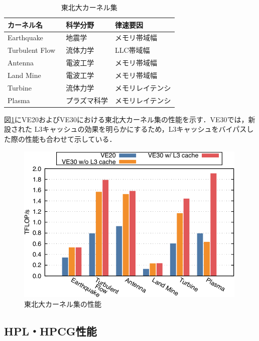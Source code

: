 ﻿\documentclass[submit,techrep,noauthor]{ipsj}
\begin{document}
\begin{table}
\caption{東北大カーネル集}\label{tbl:isc-kernels}
\begin{tabular}{@{}lll@{}}
\toprule
カーネル名                          & 科学分野        & 律速要因            \\ \midrule
Earthquake~\cite{Ariyoshi2007}      & 地震学          & メモリ帯域幅        \\
Turbulent Flow~\cite{Tsukahara2007} & 流体力学        & LLC帯域幅           \\
Antenna~\cite{Sato2011}             & 電波工学        & メモリ帯域幅        \\
Land Mine~\cite{Sato2003}           & 電波工学        & メモリ帯域幅        \\
Turbine~\cite{Tsukahara2007}        & 流体力学        & メモリレイテンシ    \\
Plasma~\cite{Katoh2005}             & プラズマ科学    & メモリレイテンシ    \\ \bottomrule
\end{tabular}
\end{table}

図\ref{fig:isc-kernels}にVE20およびVE30における東北大カーネル集の性能を示す．VE30では，新設された
L3キャッシュの効果を明らかにするため，L3キャッシュをバイパスした際の性能も合わせて示している．

\begin{figure}
  \centering
  \includegraphics{figs/isc_kernels.pdf}
  \caption{東北大カーネル集の性能}\label{fig:isc-kernels}
\end{figure}

\subsection{HPL・HPCG性能}
\end{document}

